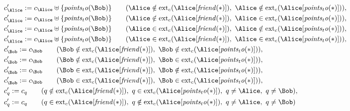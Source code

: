 \begin{align*}
&
c'_
{
\Alice
}
 := 
c_
{
\Alice
}
 \uplus 
\{
\mathit{
points_to
}
(
\Bob
)
\}
 \qquad (
\Alice
 \notin 
\mathrm{ext}_c(
\Alice
[
\mathit{
friend
}
(
\ast
)
]
)
,\ 
\Alice
 \notin 
\mathrm{ext}_c(
\Alice
[
\mathit{
points_to
}
(
\ast
)
]
)
)
,\\
&
c'_
{
\Alice
}
 := 
c_
{
\Alice
}
 \uplus 
\{
\mathit{
points_to
}
(
\Bob
)
\}
 \qquad (
\Alice
 \notin 
\mathrm{ext}_c(
\Alice
[
\mathit{
friend
}
(
\ast
)
]
)
,\ 
\Alice
 \in 
\mathrm{ext}_c(
\Alice
[
\mathit{
points_to
}
(
\ast
)
]
)
)
,\\
&
c'_
{
\Alice
}
 := 
c_
{
\Alice
}
 \uplus 
\{
\mathit{
points_to
}
(
\Bob
)
\}
 \qquad (
\Alice
 \in 
\mathrm{ext}_c(
\Alice
[
\mathit{
friend
}
(
\ast
)
]
)
,\ 
\Alice
 \notin 
\mathrm{ext}_c(
\Alice
[
\mathit{
points_to
}
(
\ast
)
]
)
)
,\\
&
c'_
{
\Alice
}
 := 
c_
{
\Alice
}
 \uplus 
\{
\mathit{
points_to
}
(
\Bob
)
\}
 \qquad (
\Alice
 \in 
\mathrm{ext}_c(
\Alice
[
\mathit{
friend
}
(
\ast
)
]
)
,\ 
\Alice
 \in 
\mathrm{ext}_c(
\Alice
[
\mathit{
points_to
}
(
\ast
)
]
)
)
,\\
&
c'_
{
\Bob
}
 := 
c_
{
\Bob
}
 \qquad (
\Bob
 \notin 
\mathrm{ext}_c(
\Alice
[
\mathit{
friend
}
(
\ast
)
]
)
,\ 
\Bob
 \notin 
\mathrm{ext}_c(
\Alice
[
\mathit{
points_to
}
(
\ast
)
]
)
)
,\\
&
c'_
{
\Bob
}
 := 
c_
{
\Bob
}
 \qquad (
\Bob
 \notin 
\mathrm{ext}_c(
\Alice
[
\mathit{
friend
}
(
\ast
)
]
)
,\ 
\Bob
 \in 
\mathrm{ext}_c(
\Alice
[
\mathit{
points_to
}
(
\ast
)
]
)
)
,\\
&
c'_
{
\Bob
}
 := 
c_
{
\Bob
}
 \qquad (
\Bob
 \in 
\mathrm{ext}_c(
\Alice
[
\mathit{
friend
}
(
\ast
)
]
)
,\ 
\Bob
 \notin 
\mathrm{ext}_c(
\Alice
[
\mathit{
points_to
}
(
\ast
)
]
)
)
,\\
&
c'_
{
\Bob
}
 := 
c_
{
\Bob
}
 \qquad (
\Bob
 \in 
\mathrm{ext}_c(
\Alice
[
\mathit{
friend
}
(
\ast
)
]
)
,\ 
\Bob
 \in 
\mathrm{ext}_c(
\Alice
[
\mathit{
points_to
}
(
\ast
)
]
)
)
,\\
&
c'_
q
 := 
c_
q
 \qquad (
q
 \notin 
\mathrm{ext}_c(
\Alice
[
\mathit{
friend
}
(
\ast
)
]
)
,\ 
q
 \in 
\mathrm{ext}_c(
\Alice
[
\mathit{
points_to
}
(
\ast
)
]
)
,\ 
q \neq 
\Alice
,\ 
q \neq 
\Bob
)
,\\
&
c'_
q
 := 
c_
q
 \qquad (
q
 \in 
\mathrm{ext}_c(
\Alice
[
\mathit{
friend
}
(
\ast
)
]
)
,\ 
q
 \notin 
\mathrm{ext}_c(
\Alice
[
\mathit{
points_to
}
(
\ast
)
]
)
,\ 
q \neq 
\Alice
,\ 
q \neq 
\Bob
)

\end{align*}
